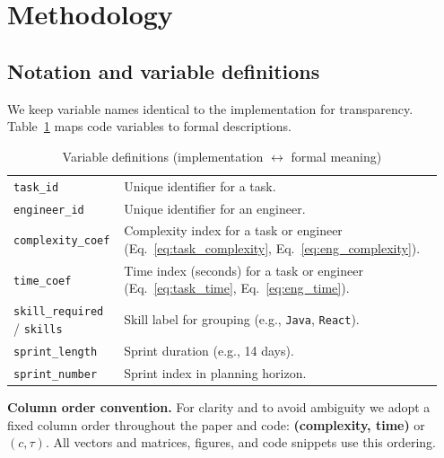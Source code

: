 \documentclass[final,1p,times]{elsarticle}
\begin{document}
\section{Methodology}\label{sec:method}

\subsection{Notation and variable definitions}
We keep variable names identical to the implementation for transparency. Table~\ref{tab:variables} maps code variables to formal descriptions.

\begin{table}[ht]
    \centering
    \caption{Variable definitions (implementation $\leftrightarrow$ formal meaning)}
    \label{tab:variables}
    \begin{tabular}{p{0.22\linewidth} p{0.73\linewidth}}
    \toprule
    \texttt{task\_id} & Unique identifier for a task. \\
    \texttt{engineer\_id} & Unique identifier for an engineer. \\
    \texttt{complexity\_coef} & Complexity index for a task or engineer (Eq.~\ref{eq:task_complexity}, Eq.~\ref{eq:eng_complexity}). \\
    \texttt{time\_coef} & Time index (seconds) for a task or engineer (Eq.~\ref{eq:task_time}, Eq.~\ref{eq:eng_time}). \\
    \texttt{skill\_required} / \texttt{skills} & Skill label for grouping (e.g., \texttt{Java}, \texttt{React}). \\
    \texttt{sprint\_length} & Sprint duration (e.g., 14 days). \\
    \texttt{sprint\_number} & Sprint index in planning horizon. \\
    \bottomrule
    \end{tabular}
\end{table}

\noindent\textbf{Column order convention.} For clarity and to avoid ambiguity we adopt a fixed column order throughout the paper and code: \textbf{(complexity, time)} or $(c,\tau)$. All vectors and matrices, figures, and code snippets use this ordering.
\end{document}
